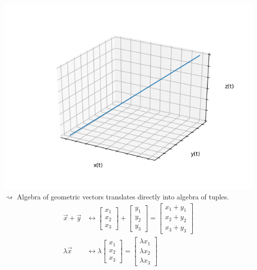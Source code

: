 \documentclass[a4paper,12pt]{article}
\begin{document}
\includegraphics[scale=0.4]{fig2} \\
$\rightsquigarrow$ Algebra of geometric vectors translates directly into algebra of tuples.
\begin{align*}
	\vec{x} + \vec{y} & \longleftrightarrow 
	\begin{bmatrix} x_1 \\ x_2 \\ x_3 \end{bmatrix} +
	\begin{bmatrix} y_1 \\ y_2 \\ y_3 \end{bmatrix} =
	\begin{bmatrix} x_1 + y_1 \\ x_2 + y_2 \\ x_3 + y_3 \end{bmatrix} \\
	\lambda \vec{x} & \longleftrightarrow \lambda \begin{bmatrix} x_1 \\ x_2 \\ x_3 \end{bmatrix} =
	\begin{bmatrix} \lambda x_1 \\ \lambda x_2 \\ \lambda x_3 \end{bmatrix} \\
\end{align*}
\end{document}
